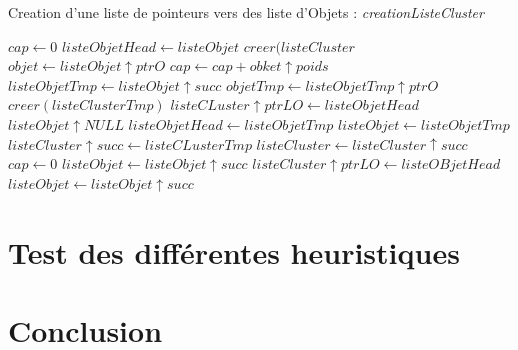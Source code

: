 \documentclass[twoside,UTF8]{EPURapport}
\begin{document}
\begin{algorithm}[H]
\caption{Creation d'une liste de pointeurs vers des liste d'Objets : \textit{creationListeCluster}}
\label{algo:creationTabObjet}
\begin{algorithmic}[1]

\STATE $cap \leftarrow 0$
\STATE $listeObjetHead \leftarrow listeObjet$
\STATE $creer(listeCluster$
	 \STATE $objet \leftarrow listeObjet\uparrow ptrO$
	 \STATE $cap \leftarrow cap + obket\uparrow poids$
	 	\STATE $listeObjetTmp \leftarrow listeObjet\uparrow succ$
	 	\STATE $objetTmp \leftarrow listeObjetTmp\uparrow ptrO$
	 		\STATE $creer(listeClusterTmp)$
	 		\STATE $listeCLuster\uparrow ptrLO \leftarrow listeObjetHead$
	 		\STATE $listeObjet\uparrow NULL$
	 		\STATE $listeObjetHead \leftarrow listeObjetTmp$
	 		\STATE $listeObjet \leftarrow listeObjetTmp$
	 		\STATE $listeCluster\uparrow succ \leftarrow listeCLusterTmp$
	 		\STATE $listeCluster \leftarrow listeCluster\uparrow succ$
	 		\STATE $cap \leftarrow 0$
	 	\ELSE
	 		\STATE $listeObjet \leftarrow listeObjet\uparrow succ$
	 	\ENDIF
	 	\STATE $listeCluster\uparrow ptrLO \leftarrow listeOBjetHead$
	 	\STATE $listeObjet \leftarrow listeObjet\uparrow succ$
	 \ENDIF
\ENDWHILE
	 

\end{algorithmic}
\end{algorithm}





\chapter{Test des différentes heuristiques}
\label{chap:test}

\chapter{Conclusion}

\end{document}
